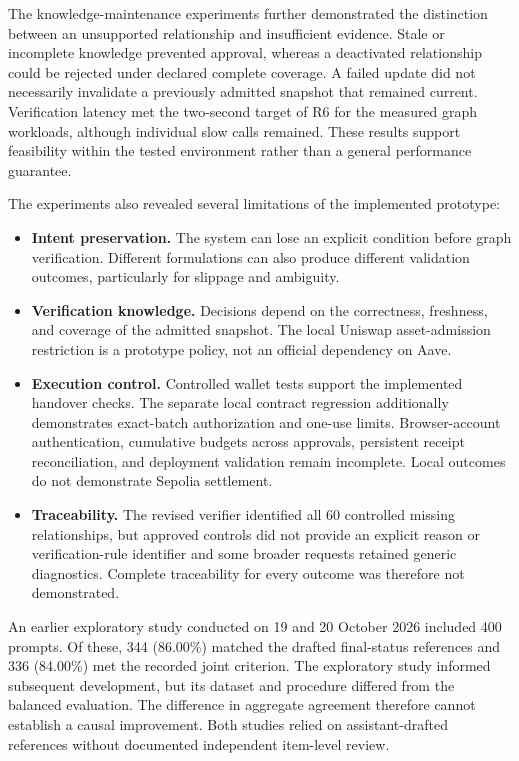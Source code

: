The knowledge-maintenance experiments further demonstrated the distinction
between an unsupported relationship and insufficient evidence. Stale or
incomplete knowledge prevented approval, whereas a deactivated relationship
could be rejected under declared complete coverage. A failed update did not
necessarily invalidate a previously admitted snapshot that remained current.
Verification latency met the two-second target of R6 for the measured graph
workloads, although individual slow calls remained. These results support
feasibility within the tested environment rather than a general performance
guarantee.

The experiments also revealed several limitations of the implemented prototype:

\begin{itemize}
    \item \textbf{Intent preservation.} The system can lose an explicit condition
    before graph verification. Different formulations can also produce
    different validation outcomes, particularly for slippage and ambiguity.

    \item \textbf{Verification knowledge.} Decisions depend on the correctness,
    freshness, and coverage of the admitted snapshot. The local Uniswap
    asset-admission restriction is a prototype policy, not an official
    dependency on Aave.

    \item \textbf{Execution control.} Controlled wallet tests support the
    implemented handover checks. The separate local contract regression
    additionally demonstrates exact-batch authorization and one-use limits.
    Browser-account authentication, cumulative budgets across approvals,
    persistent receipt reconciliation, and deployment validation remain
    incomplete. Local outcomes do not demonstrate Sepolia settlement.

    
\item \textbf{Traceability.} The revised verifier identified all 60
controlled missing relationships, but approved controls did not provide
an explicit reason or verification-rule identifier and some broader
requests retained generic diagnostics. Complete traceability for every
outcome was therefore not demonstrated.

\end{itemize}

An earlier exploratory study conducted on 19 and 20 October 2026
included 400 prompts. Of these, 344 (86.00\%) matched the drafted
final-status references and 336 (84.00\%) met the recorded joint
criterion. The exploratory study informed subsequent development,
but its dataset and procedure differed from the balanced evaluation.
The difference in aggregate agreement therefore cannot establish
a causal improvement. Both studies relied on assistant-drafted
references without documented independent item-level review.

